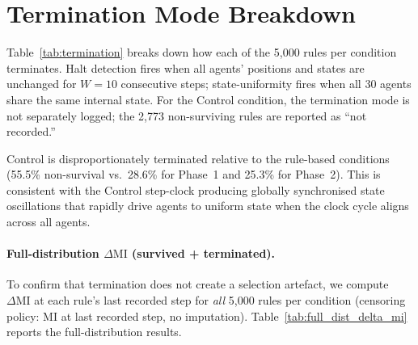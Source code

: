 \documentclass[letterpaper]{article}
\begin{document}
\section{Termination Mode Breakdown}
\label{app:termination_breakdown}

Table~\ref{tab:termination} breaks down how each of the 5{,}000 rules per
condition terminates.  Halt detection fires when all agents' positions and
states are unchanged for $W=10$ consecutive steps; state-uniformity fires
when all 30 agents share the same internal state.  For the Control condition,
the termination mode is not separately logged; the 2{,}773 non-surviving
rules are reported as ``not recorded.''

\begin{table}[htbp]
\centering
\caption{Termination mode counts per condition ($n=5{,}000$ per condition).
State-unif.\ = state-uniformity termination; N/R = not separately recorded
(Control only).}
\label{tab:termination}
\end{table}

Control is disproportionately terminated relative to the rule-based conditions
(55.5\% non-survival vs.\ 28.6\% for Phase~1 and 25.3\% for Phase~2).
This is consistent with the Control step-clock producing globally synchronised
state oscillations that rapidly drive agents to uniform state when the
clock cycle aligns across all agents.

\paragraph{Full-distribution $\Delta\mathrm{MI}$ (survived + terminated).}
To confirm that termination does not create a selection artefact, we compute
$\Delta\mathrm{MI}$ at each rule's last recorded step for \emph{all} 5{,}000
rules per condition (censoring policy: MI at last recorded step, no
imputation).  Table~\ref{tab:full_dist_delta_mi} reports the full-distribution
results.
\end{document}
